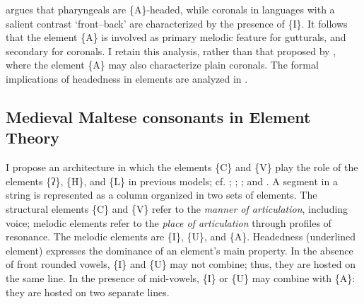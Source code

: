 \documentclass[output=paper]{langsci/langscibook}
\begin{document}
\citet[131]{Bellem2007} argues that pharyngeals are \{A\}-headed, while coronals in languages with a salient contrast ‘front–back’ are characterized by the presence of \{I\}. It follows that the element \{A\} is involved as primary melodic feature for gutturals, and secondary for  coronals. I retain this analysis, rather than that proposed by \citet{Backley2011}, where the element \{A\} may also characterize plain coronals. The formal implications of headedness in elements are analyzed in \citet{Breit2013}.

\subsection{Medieval Maltese consonants in Element Theory}\label{sec:puech:2.2}

I propose an architecture in which the elements \{C\} and \{V\} play the role of the elements \{ʔ\}, \{H\}, and \{L\} in previous models; cf. \citet{HarrisLindsey1995}; \citet{Bellem2007}; \citet{Backley2011}; and \citet{Puech2016}.
A segment in a string is represented as a column organized in two sets of elements. The structural elements \{C\} and \{V\} refer to the \textit{manner of articulation}, including  voice; melodic elements refer to the \textit{place of articulation} through profiles of resonance. The melodic elements are \{I\}, \{U\}, and \{A\}. Headedness (underlined element) expresses the dominance of an element's main property. In the absence of front rounded vowels, \{I\} and \{U\} may not combine; thus, they are hosted on the same line. In the presence of mid-vowels, \{I\} or \{U\} may combine with \{A\}: they are hosted on two separate lines.


\end{document}
